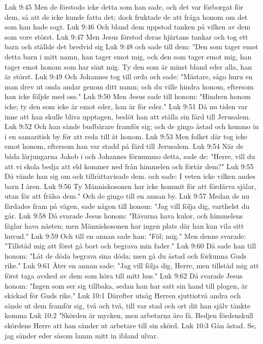Luk 9:45  Men de förstodo icke detta som han sade, och det var förborgat för dem, så att de icke kunde fatta det; dock fruktade de att fråga honom om det som han hade sagt.
Luk 9:46  Och bland dem uppstod tanken på vilken av dem som vore störst.
Luk 9:47  Men Jesus förstod deras hjärtans tankar och tog ett barn och ställde det bredvid sig
Luk 9:48  och sade till dem: "Den som tager emot detta barn i mitt namn, han tager emot mig, och den som tager emot mig, han tager emot honom som har sänt mig. Ty den som är minst bland eder alla, han är störst.
Luk 9:49  Och Johannes tog till orda och sade: "Mästare, sågo huru en man drev ut onda andar genom ditt namn; och du ville hindra honom, eftersom han icke följde med oss."
Luk 9:50  Men Jesus sade till honom: "Hindren honom icke; ty den som icke är emot eder, han är för eder."
Luk 9:51  Då nu tiden var inne att han skulle bliva upptagen, beslöt han att ställa sin färd till Jerusalem.
Luk 9:52  Och han sände budbärare framför sig; och de gingo åstad och kommo in i en samaritisk by för att reda till åt honom.
Luk 9:53  Men folket där tog icke emot honom, eftersom han var stadd på färd till Jerusalem.
Luk 9:54  När de båda lärjungarna Jakob i och Johannes förnummo detta, sade de: "Herre, vill du att vi skola bedja att eld kommer ned från himmelen och förtär dem?"
Luk 9:55  Då vände han sig om och tillrättavisade dem. och sade: I veten icke vilken andes barn I ären.
Luk 9:56  Ty Människosonen har icke kommit för att fördärva själar, utan för att frälsa dem." Och de gingo till en annan by.
Luk 9:57  Medan de nu färdades fram på vägen, sade någon till honom: "Jag vill följa dig, varthelst du går.
Luk 9:58  Då svarade Jesus honom: "Rävarna hava kulor, och himmelens fåglar hava nästen; men Människosonen har ingen plats där han kan vila sitt huvud."
Luk 9:59  Och till en annan sade han: "Föl; mig." Men denne svarade: "Tillstäd mig att först gå bort och begrava min fader."
Luk 9:60  Då sade han till honom: "Låt de döda begrava sina döda; men gå du åstad och förkunna Guds rike."
Luk 9:61  Åter en annan sade: "Jag vill följa dig, Herre, men tillstäd mig att först taga avsked av dem som höra till mitt hus."
Luk 9:62  Då svarade Jesus honom: "Ingen som ser sig tillbaka, sedan han har satt sin hand till plogen, är skickad för Guds rike."
Luk 10:1  Därefter utsåg Herren sjuttiotvå andra och sände ut dem framför sig, två och två, till var stad och ort dit han själv tänkte komma
Luk 10:2  "Skörden är mycken, men arbetarna äro få. Bedjen fördenskull skördens Herre att han sänder ut arbetare till sin skörd.
Luk 10:3  Gån åstad. Se, jag sänder eder såsom lamm mitt in ibland ulvar.
